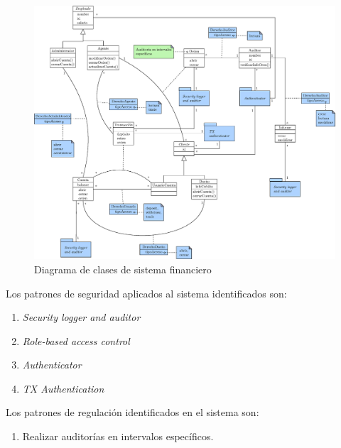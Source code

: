 \begin{figure}[p]
  \centering
    \includegraphics[angle=90,width=\textwidth,height=\textheight]{Imagenes/diag_class_financialSystem_esp.eps}
    \caption{Diagrama de clases de sistema financiero}
    \label{DC_1}
\end{figure}

Los patrones de seguridad aplicados al sistema identificados son:
\begin{enumerate}[noitemsep,label=Pat$_{\arabic*}$:,leftmargin=*]
	\item \textit{Security logger and auditor}
	\item \textit{Role-based access control}
	\item \textit{Authenticator}
	\item \textit{TX Authentication}
\end{enumerate}

Los patrones de regulación identificados en el sistema son:
\begin{enumerate}[noitemsep,label=Reg$_{\arabic*}$:,leftmargin=*]
	\item Realizar auditorías en intervalos específicos.
\end{enumerate}


